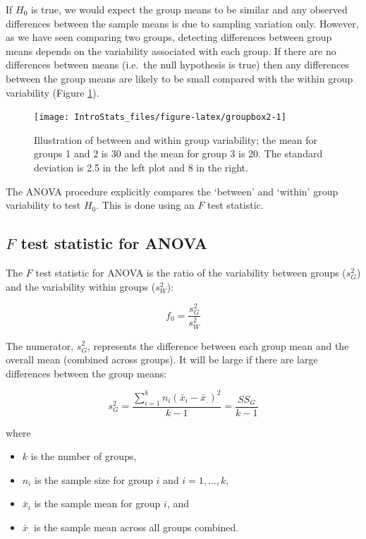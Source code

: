 \documentclass[
  oneside]{krantz}
\providecommand{\tightlist}{%
  \setlength{\itemsep}{0pt}\setlength{\parskip}{0pt}}
\begin{document}
If \(H_0\) is true, we would expect the group means to be similar and any observed differences between the sample means is due to sampling variation only. However, as we have seen comparing two groups, detecting differences between group means depends on the variability associated with each group. If there are no differences between means (i.e.~the null hypothesis is true) then any differences between the group means are likely to be small compared with the within group variability (Figure \ref{fig:groupbox2}).

\begin{figure}

{\centering \texttt{[image: IntroStats\_files/figure-latex/groupbox2-1]} 

}

\caption{Illustration of between and within group variability; the mean for groups 1 and 2 is 30 and the mean for group 3 is 20. The standard deviation is 2.5 in the left plot and 8 in the right.}\label{fig:groupbox2}
\end{figure}

The ANOVA procedure explicitly compares the `between' and `within' group variability to test \(H_0\). This is done using an \(F\) test statistic.

\hypertarget{f-test-statistic-for-anova}{%
\subsection{\texorpdfstring{\(F\) test statistic for ANOVA}{F test statistic for ANOVA}}\label{f-test-statistic-for-anova}}

The \(F\) test statistic for ANOVA is the ratio of the variability between groups (\(s_G^2\)) and the variability within groups (\(s_W^2\)):

\[f_0=\frac{s^2_G}{s^2_W}\]

The numerator, \(s^2_G\), represents the difference between each group mean and the overall mean (combined across groups). It will be large if there are large differences between the group means:

\[s^2_G=\frac{\sum_{i=1}^{k} n_i (\bar{x}_{i}-\bar{x}_{.})^2}{k-1}= \frac{SS_G}{k-1}\]

where

\begin{itemize}
\tightlist
\item
  \(k\) is the number of groups,
\item
  \(n_i\) is the sample size for group \(i\) and \(i=1, ..., k\),
\item
  \(\bar{x}_{i}\) is the sample mean for group \(i\), and
\item
  \(\bar{x}_{.}\) is the sample mean across all groups combined.
\end{itemize}
\end{document}
